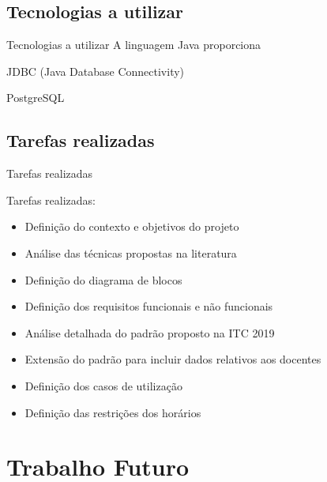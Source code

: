 \documentclass[aspectratio=169]{beamer}
\begin{document}
    \subsection{Tecnologias a utilizar}

    \begin{frame}{Tecnologias a utilizar} %
        \justifying
        A linguagem Java proporciona 

        \vfill

        JDBC (Java Database Connectivity)

        \vfill

        PostgreSQL

        \vfill
    \end{frame}

    \subsection{Tarefas realizadas}

    \begin{frame}{Tarefas realizadas}
        \justifying

        Tarefas realizadas:
        \begin{itemize}
            \item Definição do contexto e objetivos do projeto
            \item Análise das técnicas propostas na literatura
            \item Definição do diagrama de blocos
            \item Definição dos requisitos funcionais e não funcionais
            \item Análise detalhada do padrão proposto na ITC 2019
            \item Extensão do padrão para incluir dados relativos aos docentes
            \item Definição dos casos de utilização
            \item Definição das restrições dos horários
        \end{itemize}

    \end{frame}

    \section{Trabalho Futuro}
\end{document}
